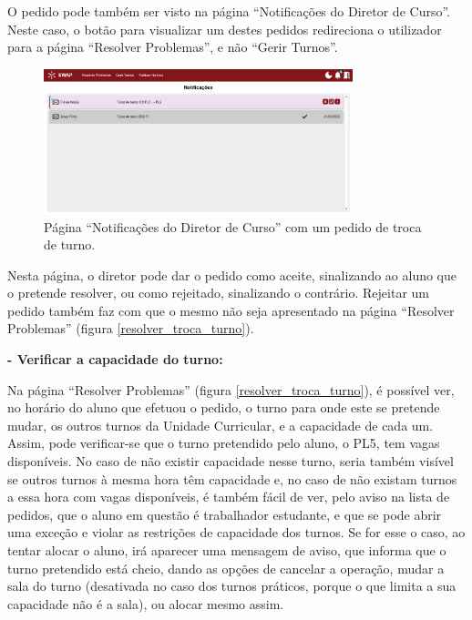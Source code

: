 \documentclass[12pt, a4paper]{article}
\begin{document}
O pedido pode também ser visto na página ``Notificações do Diretor de Curso''. Neste caso, o botão
para visualizar um destes pedidos redireciona o utilizador para a página ``Resolver Problemas'', e
não ``Gerir Turnos''.

\begin{figure}[H]
    \centering
    \includegraphics[width=0.8\textwidth]{res/manual/notificacao_troca_turno.png}
    \caption{Página ``Notificações do Diretor de Curso'' com um pedido de troca de turno.}
    \label{notificacao_troca_turno}
\end{figure}

Nesta página, o diretor pode dar o pedido como aceite, sinalizando ao aluno que o pretende resolver,
ou como rejeitado, sinalizando o contrário. Rejeitar um pedido também faz com que o mesmo não
seja apresentado na página ``Resolver Problemas'' (figura \ref{resolver_troca_turno}).

\textbf{- Verificar a capacidade do turno:}

Na página ``Resolver Problemas'' (figura \ref{resolver_troca_turno}), é possível ver, no horário do
aluno que efetuou o pedido, o turno para onde este se pretende mudar, os outros turnos da Unidade
Curricular, e a capacidade de cada um. Assim, pode verificar-se que o turno pretendido pelo aluno, o
PL5, tem vagas disponíveis. No caso de não existir capacidade nesse turno, seria também visível se
outros turnos à mesma hora têm capacidade e, no caso de não existam turnos a essa hora com vagas
disponíveis, é também fácil de ver, pelo aviso na lista de pedidos, que o aluno em questão é
trabalhador estudante, e que se pode abrir uma exceção e violar as restrições de capacidade dos
turnos. Se for esse o caso, ao tentar alocar o aluno, irá aparecer uma mensagem de aviso, que
informa que o turno pretendido está cheio, dando as opções de cancelar a operação, mudar a sala
do turno (desativada no caso dos turnos práticos, porque o que limita a sua capacidade não é a
sala), ou alocar mesmo assim.
\end{document}
